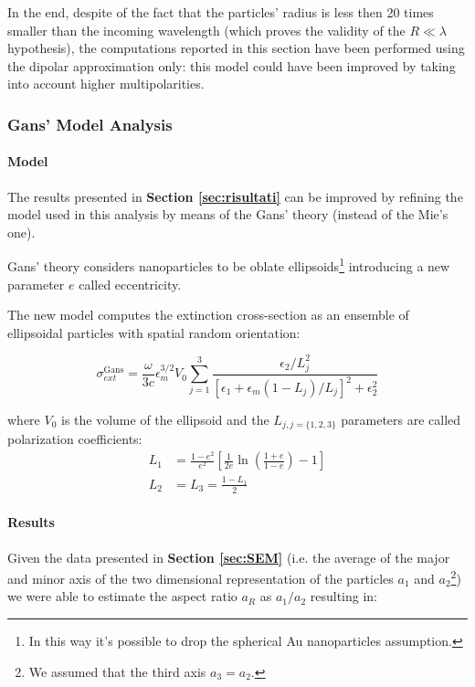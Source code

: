 \documentclass[twocolumn]{article}
\begin{document}
\begin{multicols}{2}
In the end, despite of the fact that the particles' radius is less then 20 times smaller than the incoming wavelength (which proves the validity of the $R\ll \lambda$ hypothesis), the computations reported in this section have been performed  using the dipolar approximation only: this model could have been improved by taking into account higher multipolarities.

\subsubsection{Gans' Model Analysis}
\paragraph{Model}
The results presented in \textbf{Section \ref{sec:risultati}} can be improved by refining the model used in this analysis by means of the Gans' theory (instead of the Mie's one).

Gans' theory considers nanoparticles to be oblate ellipsoids\footnote{In this way it's possible to drop the spherical Au nanoparticles assumption.} introducing a new parameter $e$ called eccentricity.

\noindent
The new model computes the extinction cross-section as an ensemble of ellipsoidal particles with spatial random orientation:

\begin{equation*}
\sigma_{ext}^{\text{Gans}} = \frac{\omega}{3c} \epsilon_m^{3/2}V_{0} \sum^{3}_{j=1}{\frac{\epsilon_2/L_j^2}{[\epsilon_1 + \epsilon_m(1-L_j)/L_j]^2 + \epsilon_2^2}}
\end{equation*}

\noindent
where $V_0$ is the volume of the ellipsoid and the $L_{j,j=\{1,2,3\}}$ parameters are called polarization coefficients:
\begin{align*}
L_{1}&=\frac{1-e^{2}}{e^{2}}\left[\frac{1}{2 e} \ln \left(\frac{1+e}{1-e}\right)-1\right]\\
L_{2}&=L_{3}=\frac{1-L_{1}}{2}
\end{align*}

\paragraph{Results}
Given the data presented in \textbf{Section \ref{sec:SEM}} (i.e. the average of the major
and minor axis of the two dimensional representation of the particles $a_1$ and $a_2$\footnote{We assumed that the third axis $a_3=a_2$.}) we were able to estimate the aspect ratio $a_R$ as  $a_1/a_2$ resulting in:


\end{multicols}
\end{document}
